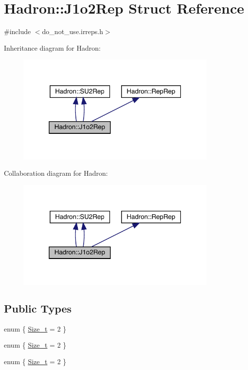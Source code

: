 \hypertarget{structHadron_1_1J1o2Rep}{}\section{Hadron\+:\+:J1o2\+Rep Struct Reference}
\label{structHadron_1_1J1o2Rep}


{\ttfamily \#include $<$do\+\_\+not\+\_\+use.\+irreps.\+h$>$}



Inheritance diagram for Hadron\+:\nopagebreak
\begin{figure}[H]
\begin{center}
\leavevmode
\includegraphics[width=283pt]{df/d3d/structHadron_1_1J1o2Rep__inherit__graph}
\end{center}
\end{figure}


Collaboration diagram for Hadron\+:\nopagebreak
\begin{figure}[H]
\begin{center}
\leavevmode
\includegraphics[width=283pt]{df/daa/structHadron_1_1J1o2Rep__coll__graph}
\end{center}
\end{figure}
\subsection*{Public Types}
\begin{DoxyCompactItemize}
\item 
enum \{ \mbox{\hyperlink{structHadron_1_1J1o2Rep_a69f7a020556d38ed8efabb8254947e41ab3e025d42324973311b24f69bf7b64bf}{Size\+\_\+t}} = 2
 \}
\item 
enum \{ \mbox{\hyperlink{structHadron_1_1J1o2Rep_a69f7a020556d38ed8efabb8254947e41ab3e025d42324973311b24f69bf7b64bf}{Size\+\_\+t}} = 2
 \}
\item 
enum \{ \mbox{\hyperlink{structHadron_1_1J1o2Rep_a69f7a020556d38ed8efabb8254947e41ab3e025d42324973311b24f69bf7b64bf}{Size\+\_\+t}} = 2
 \}
\end{DoxyCompactItemize}
